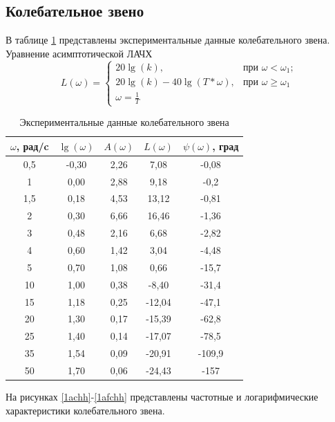 \documentclass[a4paper, 12pt]{article}
\begin{document}
\begin{center}
	\section{Колебательное звено}
\end{center}\par

В таблице \ref{tab:coleb} представлены экспериментальные данные колебательного звена.
Уравнение асимптотической ЛАЧХ
\begin{equation}
	L(\omega) = \begin{cases}
					20\lg(k), & \mbox{при } \omega<\omega_1;\\
					20\lg(k)-40\lg(T*\omega), & \mbox{при } \omega \geq \omega_1\\
					\omega = \frac{1}{T}
				\end{cases}
\end{equation}
		
\begin{table}[h]
	\caption{Экспериментальные данные колебательного звена}
	\label{tab:coleb}
	\begin{center}
		
	\begin{tabular}{|c|c|c|c|c|}
		\hline
		$\omega$, рад/c   & $\lg(\omega)$   & $A(\omega)$ & $L(\omega)$  & $\psi(\omega)$, град   \\
		\hline
		0,5 & -0,30 & 2,26 & 7,08   & -0,08  \\
		\hline
		1   & 0,00  & 2,88 & 9,18  & -0,2   \\
		\hline
		1,5 & 0,18  & 4,53 & 13,12 & -0,81  \\
		\hline
		2   & 0,30  & 6,66 & 16,46 & -1,36  \\
		\hline
		3   & 0,48  & 2,16 & 6,68 & -2,82  \\
		\hline
		4   & 0,60  & 1,42 & 3,04 & -4,48  \\
		\hline
		5   & 0,70  & 1,08 & 0,66     & -15,7  \\
		\hline
		10  & 1,00  & 0,38 & -8,40   & -31,4  \\
		\hline
		15  & 1,18  & 0,25 & -12,04  & -47,1  \\
		\hline
		20  & 1,30  & 0,17 & -15,39  & -62,8  \\
		\hline
		25  & 1,40  & 0,14 & -17,07  & -78,5  \\
		\hline
		35  & 1,54  & 0,09 & -20,91  & -109,9 \\
		\hline
		50  & 1,70  & 0,06 & -24,43  & -157  \\
		\hline
	\end{tabular}
\end{center}
\end{table}
На рисунках \ref{1achh}-\ref{1afchh} представлены частотные и логарифмические характеристики колебательного звена.
\newpage
\end{document}
